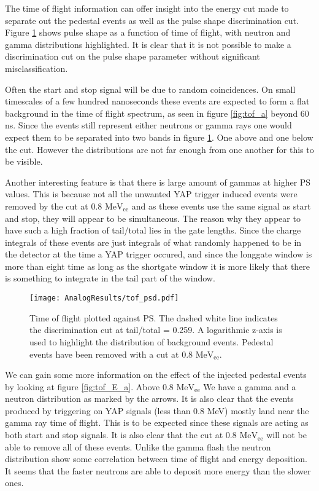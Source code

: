 \documentclass[main.tex]{subfiles}
\begin{document}
The time of flight information can offer insight into the energy cut made to separate out the pedestal events as well as the pulse shape discrimination cut. Figure \ref{fig:tof_ps_a} shows pulse shape as a function of time of flight, with neutron and gamma distributions highlighted. It is clear that it is not possible to make a discrimination cut on the pulse shape parameter without significant misclassification. 

Often the start and stop signal will be due to random coincidences. On small timescales of a few hundred nanoseconds these events are expected to form a flat background in the time of flight spectrum, as seen in figure \ref{fig:tof_a} beyond 60 ns. Since the events still represent either neutrons or gamma rays one would expect them to be separated into two bands in figure \ref{fig:tof_ps_a}. One above and one below the cut. However the distributions are not far enough from one another for this to be visible.

Another interesting feature is that there is large amount of gammas at higher PS values. This is because not all the unwanted YAP trigger induced events were removed by the cut at 0.8 $\text{MeV}_\text{ee}$ and as these events use the same signal as start and stop, they will appear to be simultaneous. The reason why they appear to have such a high fraction of tail/total lies in the gate lengths. Since the charge integrals of these events are just integrals of what randomly happened to be in the detector at the time a YAP trigger occured, and since the longgate window is more than eight time as long as the shortgate window it is more likely that there is something to integrate in the tail part of the window.
\begin{figure}[ht]
    \centering
        \texttt{[image: AnalogResults/tof\_psd.pdf]}
        \caption{Time of flight plotted against PS. The dashed white line indicates the discrimination cut at tail/total = 0.259. A logarithmic z-axis is used to highlight the distribution of background events. Pedestal events have been removed with a cut at 0.8 $\text{MeV}_\text{ee}$.}
    \label{fig:tof_ps_a} 
\end{figure}

We can gain some more information on the effect of the injected pedestal events by looking at figure \ref{fig:tof_E_a}. Above 0.8 $\text{MeV}_\text{ee}$ We have a gamma and a neutron distribution as marked by the arrows. It is also clear that the events produced by triggering on YAP signals (less than 0.8 MeV) mostly land near the gamma ray time of flight. This is to be expected since these signals are acting as both start and stop signals. It is also clear that the cut at 0.8 $\text{MeV}_\text{ee}$ will not be able to remove all of these events. Unlike the gamma flash the neutron distribution show some correlation between time of flight and energy deposition. It seems that the faster neutrons are able to deposit more energy than the slower ones.
\end{document}
